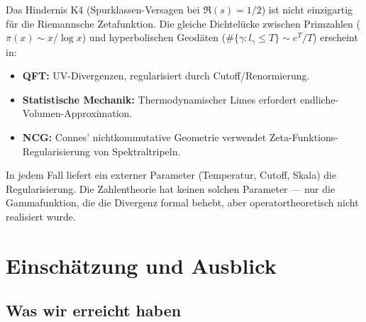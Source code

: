 \documentclass[12pt,a4paper]{article}
\theoremstyle{definition}
\theoremstyle{remark}
\begin{document}
Das Hindernis K4 (Spurklassen-Versagen bei $\Re(s) = 1/2$) ist nicht einzigartig für die Riemannsche Zetafunktion. Die gleiche Dichtelücke zwischen Primzahlen ($\pi(x) \sim x/\log x$) und hyperbolischen Geodäten ($\#\{\gamma: l_\gamma \leq T\} \sim e^T/T$) erscheint in:
\begin{itemize}
  \item \textbf{QFT:} UV-Divergenzen, regularisiert durch Cutoff/Renormierung.
  \item \textbf{Statistische Mechanik:} Thermodynamischer Limes erfordert endliche-Volumen-Approximation.
  \item \textbf{NCG:} Connes' nichtkommutative Geometrie verwendet Zeta-Funktions-Regularisierung von Spektraltripeln.
\end{itemize}
In jedem Fall liefert ein externer Parameter (Temperatur, Cutoff, Skala) die Regularisierung. Die Zahlentheorie hat keinen solchen Parameter --- nur die Gammafunktion, die die Divergenz formal behebt, aber operatortheoretisch nicht realisiert wurde.


\section{Einschätzung und Ausblick}
\label{sec:outlook}

\subsection{Was wir erreicht haben}
\end{document}
